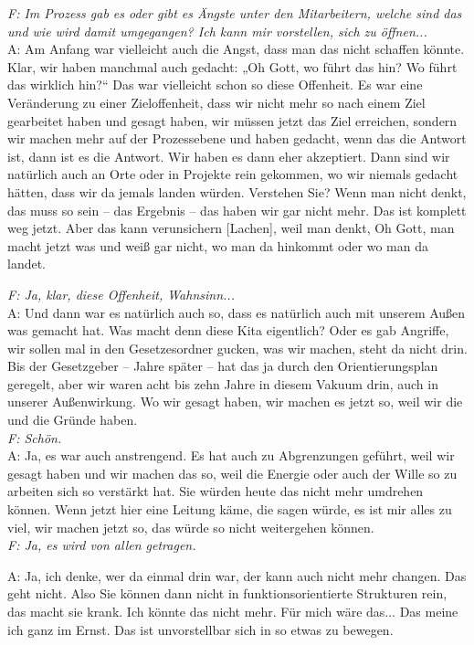 \begin{linenumbers*}
\emph{F: Im Prozess gab es oder gibt es Ängste unter den Mitarbeitern, welche sind das und wie wird damit umgegangen? Ich kann mir vorstellen, sich zu öffnen...}\\
A: Am Anfang war vielleicht auch die Angst, dass man das nicht schaffen könnte.
Klar, wir haben manchmal auch gedacht: „Oh Gott, wo führt das hin? Wo führt das
wirklich hin?“ Das war vielleicht schon so diese Offenheit. Es war eine
Veränderung zu einer Zieloffenheit, dass wir nicht mehr so nach einem Ziel
gearbeitet haben und gesagt haben, wir müssen jetzt das Ziel erreichen, sondern
wir machen mehr auf der Prozessebene und haben gedacht, wenn das die Antwort
ist, dann ist es die Antwort. Wir haben es dann eher akzeptiert. Dann sind wir
natürlich auch an Orte oder in Projekte rein gekommen, wo wir niemals gedacht
hätten, dass wir da jemals landen würden. Verstehen Sie? Wenn man nicht denkt,
das muss so sein -- das Ergebnis -- das haben wir gar nicht mehr. Das ist
komplett weg jetzt. Aber das kann verunsichern {[Lachen]}, weil man denkt, Oh Gott, man macht jetzt was und weiß gar nicht, wo man da hinkommt oder wo man da landet. 

\emph{F: Ja, klar, diese Offenheit, Wahnsinn...}\\
A: Und dann war es natürlich auch so, dass es natürlich auch mit unserem Außen was gemacht hat. Was macht denn diese Kita eigentlich? Oder es gab Angriffe, wir sollen mal in den Gesetzesordner gucken, was wir machen, steht da nicht drin. Bis der Gesetzgeber -- Jahre später -- hat das ja durch den Orientierungsplan geregelt, aber wir waren acht bis zehn Jahre in diesem Vakuum drin, auch in unserer Außenwirkung. Wo wir gesagt haben, wir machen es jetzt so, weil wir die und die Gründe haben.\\
\emph{F: Schön.}\\
A: Ja, es war auch anstrengend. Es hat auch zu Abgrenzungen geführt, weil wir gesagt haben und wir machen das so, weil die Energie oder auch der Wille so zu arbeiten sich so verstärkt hat. Sie würden heute das nicht mehr umdrehen können. Wenn jetzt hier eine Leitung käme, die sagen würde, es ist mir alles zu viel, wir machen jetzt so, das würde so nicht weitergehen können.\\
\emph{F: Ja, es wird von allen getragen.}

A: Ja, ich denke, wer da einmal drin war, der kann auch nicht mehr changen. Das geht nicht. Also Sie können dann nicht in funktionsorientierte Strukturen rein, das macht sie krank. Ich könnte das nicht mehr. Für mich wäre das... Das meine ich ganz im Ernst. Das ist unvorstellbar sich in so etwas zu bewegen. 


\end{linenumbers*}
